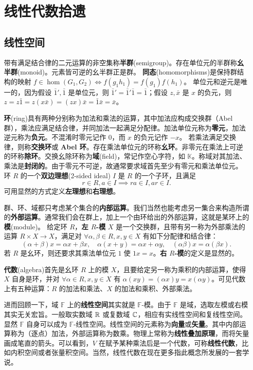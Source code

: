\chapter{线性代数拾遗}\label{appx:LA}

\section{线性空间}

带有满足结合律的二元运算的非空集称\textbf{半群}(semigroup)。存在单位元的半群称\textbf{幺半群}(monoid)。元素皆可逆的幺半群正是群。
\textbf{同态}(homomorphisms)是保持群结构的映射 $f \in \hom(G_1, G_2 ) \Leftrightarrow f (g_1 h_1 )=f (g_1 ) f (h_1 )$。
单位元和逆元是唯一的，因为假设 $\bar 1',\bar 1$ 是单位元，则 $\bar 1'=\bar 1'\bar 1=\bar 1$；假设 $z,\bar x$ 是 $x$ 的负元，则 $z=z\bar 1=z(x\bar x)=(zx)\bar x=\bar 1\bar x=\bar x$。

\textbf{环}(ring)具有两种分别称为加法和乘法的运算，其中加法应构成交换群（Abel 群），乘法应满足结合律，并同加法一起满足分配律。加法单位元称为\textbf{零元}，加法逆元称为\textbf{负元}。不混淆时零元记作 $0$，而 $x$ 的负元记作 $-x$。
若乘法满足交换律，则称\textbf{交换环}或 \textbf{Abel 环}。存在乘法单位元的环称\textbf{幺环}。非零元在乘法上可逆的环称\textbf{除环}。交换幺除环称为\textbf{域}(field)，常记作空心字符，如 $\mathbb{K}$。称域对其加法、乘法是\textbf{封闭的}。由于零元不可逆，故通常要求域首先至少有零元和乘法单位元。
环 $R$ 的一个\textbf{双边理想}(2-sided ideal) $I$ 是 $R$ 的一个子环，且满足 
\[r \in R, a \in I \implies r a \in I, a r \in I.\]
可用显然的方式定义\textbf{左理想}和\textbf{右理想}。

群、环、域都只考虑某个集合的\textbf{内部运算}。我们当然也能考虑另一集合来构造所谓的\textbf{外部运算}。通常我们会在群上，加上一个由环给出的外部运算，这就是某环上的\textbf{模}(module)。
给定环 $R$，\textbf{左 $R$-模} $X$ 是一个交换群，且带有另一称为外部乘法的运算 $R \times X \rightarrow X$，满足对 $\forall \alpha,\beta \in R, x,y \in X$ 有如下分配律和结合律：
\[(\alpha+\beta) x=\alpha x+\beta x,\quad \alpha(x+y)=\alpha x+\alpha y,\quad (\alpha\beta)x=\alpha(\beta x).\]
若 $R$ 是幺环，则还要求其乘法单位元 $1$ 使 $1x=x$。\textbf{右 $R$-模}的定义是显然的。

\textbf{代数}(algebra)首先是幺环 $R$ 上的模 $X$，且要给定另一称为乘积的内部运算，使得 $X$ 自身是环，并对 $\forall \alpha \in R, x,y \in X$ 有 $\alpha(xy)=(\alpha x) y=x(\alpha y)$。可见代数上有五种运算：$R$ 的加法和乘法、$X$ 的加法和乘积、外部乘法。

进而回顾一下，域 $\mathbb F$ 上的\textbf{线性空间}其实就是 $\mathbb F$-模。由于 $\mathbb F$ 是域，选取左模或右模其实无关宏旨。一般取实数域 $\mathbb{R}$ 或复数域 $\mathbb{C}$，相应有实线性空间和复线性空间。显然 $\mathbb F$ 自身可以成为 $\mathbb F$-线性空间。线性空间的元素称为\textbf{向量}或\textbf{矢量}。其中内部运算称为（逐点）加法，外部运算称为数乘。物理上常称为\textbf{线性叠加原理}，而将矢量画成笔直的箭头。可以看到，$V$ 在赋予某种乘法后是一个代数，可称\textbf{线性代数}，比如内积空间或者张量积空间。当然，线性代数在现在更多指此概念所发展的一套学说。

